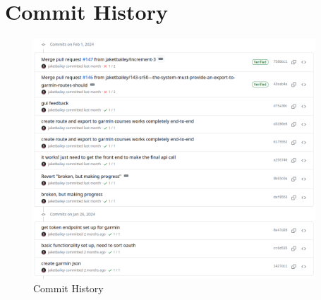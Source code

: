 \chapter{Commit History}
\begin{figure}[ht!]
    \centering
    \includegraphics[width=400px]{figures/commit-history.png}
    \caption{Commit History}
    \label{fig:commits}
\end{figure}

